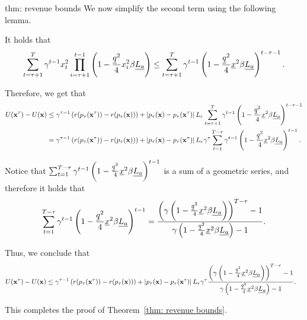 \begin{proofof}{thm: revenue bounds}
We now simplify the second term using the following lemma.
\begin{lemma} \label{lemma: simplify bound summation}
It holds that
\begin{align*}
\sum_{t = \tau + 1}^T \gamma^{t-1} x_t^2 \prod_{i = \tau + 1}^{t-1} \left( 1 - \frac{\underline{q} ^2}{4} x_i^2 \beta \underline{L_a} \right) \leq \sum_{t = \tau + 1}^{T} \gamma^{t-1} \left( 1 - \frac{\underline{q} ^2}{4} \underline{x}^2 \beta \underline{L_a} \right)^{t - \tau - 1}.
\end{align*}
\end{lemma}

Therefore, we get that
\begin{align*}
U({\bf{x}}^\tau) - U({\bf{x}}) &\leq \gamma^{\tau - 1} \left( r(p_\tau({\bf{x}}^\tau)) - r(p_\tau({\bf{x}})) \right) +  \left| p_\tau({\bf{x}}) - p_\tau({\bf{x}}^\tau) \right| L_r \sum_{t = \tau + 1}^{T} \gamma^{t-1} \left( 1 - \frac{\underline{q} ^2}{4} \underline{x}^2 \beta \underline{L_a} \right)^{t - \tau - 1} \\
&= \gamma^{\tau - 1} \left( r(p_\tau({\bf{x}}^\tau)) - r(p_\tau({\bf{x}})) \right) +  \left| p_\tau({\bf{x}}) - p_\tau({\bf{x}}^\tau) \right| L_r \gamma^\tau \sum_{t = 1}^{T - \tau} \gamma^{t-1} \left( 1 - \frac{\underline{q} ^2}{4} \underline{x}^2 \beta \underline{L_a} \right)^{t - 1}.
\end{align*}

Notice that $\sum_{t = 1}^{T-\tau} \gamma^{t-1} 
\left( 1 - \frac{\underline{q} ^2}{4} \underline{x}^2 \beta \underline{L_a} \right) ^{t - 1}$ is a sum of a geometric series, and therefore it holds that
\begin{align*}
\sum_{t = 1}^{T-\tau} \gamma^{t-1} 
\left( 1 - \frac{\underline{q} ^2}{4} \underline{x}^2 \beta \underline{L_a} \right) ^{t - 1} = \frac{\left(\gamma \left( 1 - \frac{\underline{q} ^2}{4} \underline{x}^2 \beta \underline{L_a} \right) \right)^{T - \tau} - 1}{\gamma \left( 1 - \frac{\underline{q} ^2}{4} \underline{x}^2 \beta \underline{L_a} \right) - 1}.
\end{align*}

Thus, we conclude that
\begin{align*}
U({\bf{x}}^\tau) - U({\bf{x}}) &\leq  \gamma^{\tau - 1} \left( r(p_\tau({\bf{x}}^\tau)) - r(p_\tau({\bf{x}})) \right) +  \left| p_\tau({\bf{x}}) - p_\tau({\bf{x}}^\tau) \right| L_r \gamma^{\tau} \frac{\left(\gamma \left( 1 - \frac{\underline{q} ^2}{4} \underline{x}^2 \beta \underline{L_a} \right) \right)^{T - \tau} - 1}{\gamma \left( 1 - \frac{\underline{q} ^2}{4} \underline{x}^2 \beta \underline{L_a} \right) - 1}.
\end{align*}

This completes the proof of Theorem~\ref{thm: revenue bounds}.
\end{proofof}






























